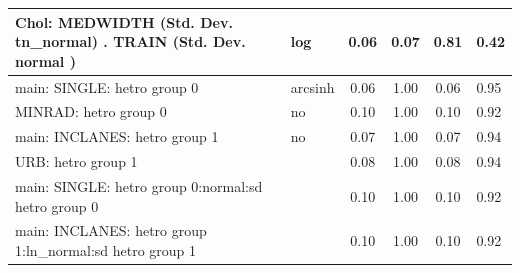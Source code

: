 \begin{table}
\begin{center}
\begin{tabular}{|l|l|c|c|c|l|}
			\hline
			 Chol: MEDWIDTH (Std. Dev. tn_normal) . TRAIN (Std. Dev.   normal ) & log & 0.06 & 0.07 & 0.81 & 0.42 \\
			\hline
			main: SINGLE: hetro group 0 & arcsinh & 0.06 & 1.00 & 0.06 & 0.95 \\
			\hline
			MINRAD: hetro group 0 & no & 0.10 & 1.00 & 0.10 & 0.92 \\
			\hline
			main: INCLANES: hetro group 1 & no & 0.07 & 1.00 & 0.07 & 0.94 \\
			\hline
			URB: hetro group 1 &  & 0.08 & 1.00 & 0.08 & 0.94 \\
			\hline
			main: SINGLE: hetro group 0:normal:sd  hetro group 0 &  & 0.10 & 1.00 & 0.10 & 0.92 \\
			\hline
			main: INCLANES: hetro group 1:ln_normal:sd  hetro group 1 &  & 0.10 & 1.00 & 0.10 & 0.92 \\
			\hline
		\end{tabular}
	\end{center}
\end{table}